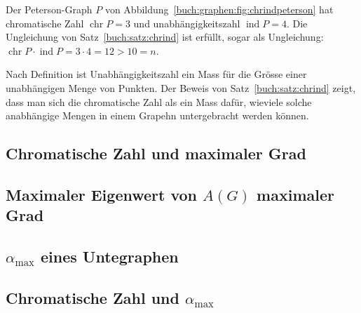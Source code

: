 \begin{beispiel}
Der Peterson-Graph $P$ von Abbildung~\ref{buch:graphen:fig:chrindpeterson}
hat chromatische Zahl $\operatorname{chr}P=3$ und unabhängigkeitszahl
$\operatorname{ind}P=4$.
Die Ungleichung von Satz~\ref{buch:satz:chrind} ist erfüllt, sogar als
Ungleichung: $\operatorname{chr}P\cdot\operatorname{ind}P=3\cdot 4=12>10=n$.
\end{beispiel}

Nach Definition ist Unabhängigkeitszahl ein Mass für die Grösse einer
unabhängigen Menge von Punkten.
Der Beweis von Satz~\ref{buch:satz:chrind} zeigt, dass man sich die
chromatische Zahl als ein Mass dafür, wieviele solche anabhängige 
Mengen in einem Grapehn untergebracht werden können.

\subsection{Chromatische Zahl und maximaler Grad
\label{buch:subsection:chr-und-maximaler-grad}}

\subsection{Maximaler Eigenwert von $A(G)$ maximaler Grad
\label{buch:subsection:maximaler-eigenwert}}

\subsection{$\alpha_{\text{max}}$ eines Untegraphen
\label{buch:subsection:alphamax-eines-untergraphen}}

\subsection{Chromatische Zahl und $\alpha_{\text{max}}$
\label{buch:subsection:chr-und-alpha-max}}

